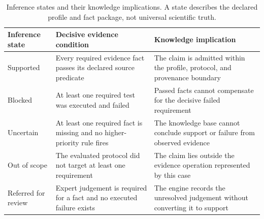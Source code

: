 \begin{table}[t!]
\centering
\caption{Inference states and their knowledge implications. A state describes the declared profile and fact package, not universal scientific truth.}
\label{tab:decision-actions}
\footnotesize
\renewcommand{\arraystretch}{1.15}
\begin{tabularx}{\textwidth}{@{}p{}p{}Y@{}}
\toprule
Inference state & Decisive evidence condition & Knowledge implication \\
\midrule
Supported & Every required evidence fact passes its declared source predicate & The claim is admitted within the profile, protocol, and provenance boundary \\
\addlinespace[3pt]
Blocked & At least one required test was executed and failed & Passed facts cannot compensate for the decisive failed requirement \\
\addlinespace[3pt]
Uncertain & At least one required fact is missing and no higher-priority rule fires & The knowledge base cannot conclude support or failure from observed evidence \\
\addlinespace[3pt]
Out of scope & The evaluated protocol did not target at least one requirement & The claim lies outside the evidence operation represented by this case \\
\addlinespace[3pt]
Referred for review & Expert judgement is required for a fact and no executed failure exists & The engine records the unresolved judgement without converting it to support \\
\bottomrule
\end{tabularx}
\end{table}
